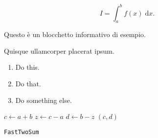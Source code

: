 \documentclass{article}
\begin{document}
\begin{equation}
I = \int_{a}^{b} f(x) \; \text{d}x.
\end{equation}

\begin{info}
Questo è un blocchetto informativo di esempio.
\end{info}

\begin{question}
Quisque ullamcorper placerat ipsum.
\begin{enumerate}[label=\alph*)]
\item Do this.
\item Do that.
\item Do something else.
\end{enumerate}
\end{question}

\begin{center}
\begin{minipage}{0.5\linewidth}
\begin{algorithm}[H]
$c \leftarrow a+b$\;
$z \leftarrow c-a$\;
$d \leftarrow b-z$\;
\Return $(c,d)$\;
\caption{\texttt{FastTwoSum}}
\end{algorithm}
\end{minipage}
\end{center}
\end{document}
